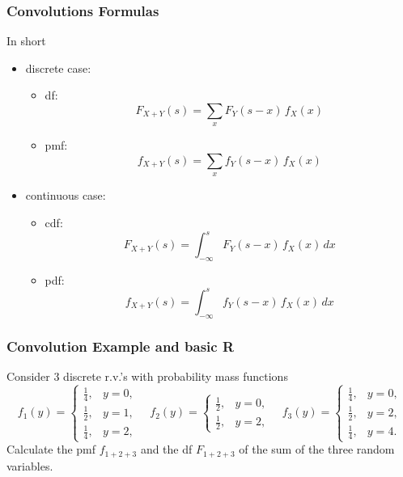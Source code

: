 \documentclass[11pt]{article}
\newcommand{\noi}{\noindent}
\begin{document}
\subsubsection*{Convolutions Formulas}

\noi In short
\begin{itemize}
  \item discrete case:
    \begin{itemize}
      \item df: 
        \[
        F_{X+Y}(s)
        = \sum_x F_Y(s - x)\,f_X(x)
        \]
      \item pmf:
        \[
        f_{X+Y}(s)
        = \sum_x f_Y(s - x)\,f_X(x)
        \]
    \end{itemize}
  \item continuous case:
    \begin{itemize}
      \item cdf:
        \[
        F_{X+Y}(s)
        = \int_{-\infty}^{s} F_Y(s - x)\,f_X(x)\,dx
        \]
      \item pdf:
        \[
        f_{X+Y}(s)
        = \int_{-\infty}^{s} f_Y(s - x)\,f_X(x)\,dx
        \]
    \end{itemize}
\end{itemize}

\subsubsection{Convolution Example and basic R}
\noi Consider 3 discrete r.v.'s with probability mass functions
\[
f_1(y)=\begin{cases}
\tfrac{1}{4},&y=0,\\
\tfrac{1}{2},&y=1,\\
\tfrac{1}{4},&y=2,
\end{cases}
\quad
f_2(y)=\begin{cases}
\tfrac{1}{2},&y=0,\\
\tfrac{1}{2},&y=2,
\end{cases}
\quad
f_3(y)=\begin{cases}
\tfrac{1}{4},&y=0,\\
\tfrac{1}{2},&y=2,\\
\tfrac{1}{4},&y=4.
\end{cases}
\]
\noi Calculate the pmf \(f_{1+2+3}\) and the df \(F_{1+2+3}\) of the sum of the three random variables.
\end{document}
